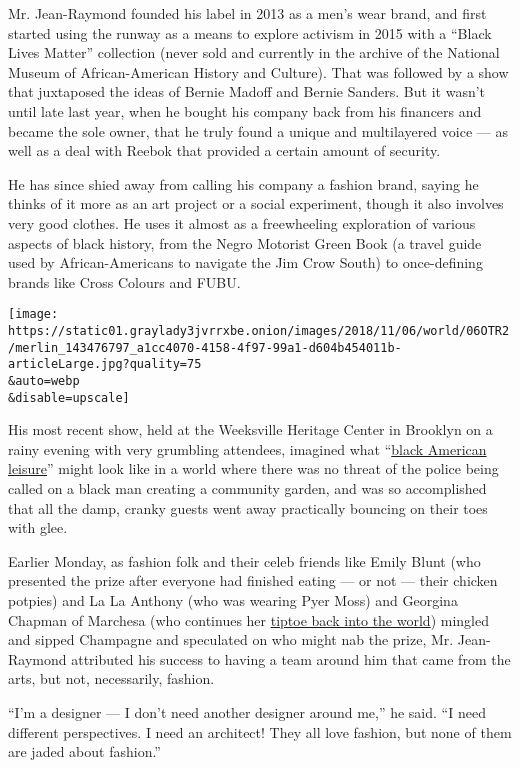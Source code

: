 Mr. Jean-Raymond founded his label in 2013 as a men's wear brand, and
first started using the runway as a means to explore activism in 2015
with a ``Black Lives Matter'' collection (never sold and currently in
the archive of the National Museum of African-American History and
Culture). That was followed by a show that juxtaposed the ideas of
Bernie Madoff and Bernie Sanders. But it wasn't until late last year,
when he bought his company back from his financers and became the sole
owner, that he truly found a unique and multilayered voice --- as well
as a deal with Reebok that provided a certain amount of security.

He has since shied away from calling his company a fashion brand, saying
he thinks of it more as an art project or a social experiment, though it
also involves very good clothes. He uses it almost as a freewheeling
exploration of various aspects of black history, from the Negro Motorist
Green Book (a travel guide used by African-Americans to navigate the Jim
Crow South) to once-defining brands like Cross Colours and FUBU.

\texttt{[image: https://static01.graylady3jvrrxbe.onion/images/2018/11/06/world/06OTR2/merlin\_143476797\_a1cc4070-4158-4f97-99a1-d604b454011b-articleLarge.jpg?quality=75\\\&auto=webp\\\&disable=upscale]}

His most recent show, held at the Weeksville Heritage Center in Brooklyn
on a rainy evening with very grumbling attendees, imagined what
``\href{https://www.nytimes3xbfgragh.onion/2018/09/09/fashion/pyer-moss-black-life-fashion-eckhaus-latta.html}{black
American leisure}'' might look like in a world where there was no threat
of the police being called on a black man creating a community garden,
and was so accomplished that all the damp, cranky guests went away
practically bouncing on their toes with glee.

Earlier Monday, as fashion folk and their celeb friends like Emily Blunt
(who presented the prize after everyone had finished eating --- or not
--- their chicken potpies) and La La Anthony (who was wearing Pyer Moss)
and Georgina Chapman of Marchesa (who continues her
\href{https://www.nytimes3xbfgragh.onion/2018/05/10/fashion/marchesa-harvey-weinstein.html}{tiptoe
back into the world}) mingled and sipped Champagne and speculated on who
might nab the prize, Mr. Jean-Raymond attributed his success to having a
team around him that came from the arts, but not, necessarily, fashion.

``I'm a designer --- I don't need another designer around me,'' he said.
``I need different perspectives. I need an architect! They all love
fashion, but none of them are jaded about fashion.''

